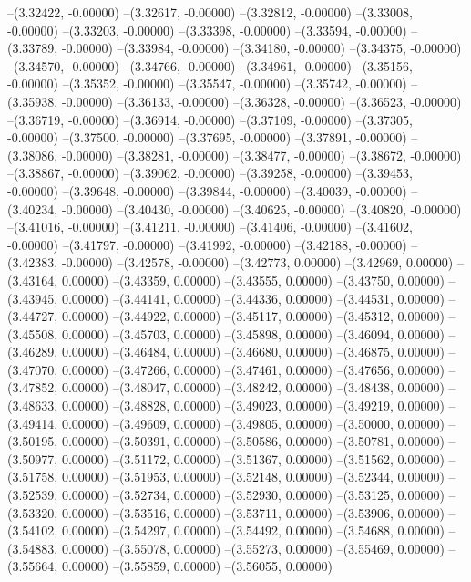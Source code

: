 --(3.32422, -0.00000)
--(3.32617, -0.00000)
--(3.32812, -0.00000)
--(3.33008, -0.00000)
--(3.33203, -0.00000)
--(3.33398, -0.00000)
--(3.33594, -0.00000)
--(3.33789, -0.00000)
--(3.33984, -0.00000)
--(3.34180, -0.00000)
--(3.34375, -0.00000)
--(3.34570, -0.00000)
--(3.34766, -0.00000)
--(3.34961, -0.00000)
--(3.35156, -0.00000)
--(3.35352, -0.00000)
--(3.35547, -0.00000)
--(3.35742, -0.00000)
--(3.35938, -0.00000)
--(3.36133, -0.00000)
--(3.36328, -0.00000)
--(3.36523, -0.00000)
--(3.36719, -0.00000)
--(3.36914, -0.00000)
--(3.37109, -0.00000)
--(3.37305, -0.00000)
--(3.37500, -0.00000)
--(3.37695, -0.00000)
--(3.37891, -0.00000)
--(3.38086, -0.00000)
--(3.38281, -0.00000)
--(3.38477, -0.00000)
--(3.38672, -0.00000)
--(3.38867, -0.00000)
--(3.39062, -0.00000)
--(3.39258, -0.00000)
--(3.39453, -0.00000)
--(3.39648, -0.00000)
--(3.39844, -0.00000)
--(3.40039, -0.00000)
--(3.40234, -0.00000)
--(3.40430, -0.00000)
--(3.40625, -0.00000)
--(3.40820, -0.00000)
--(3.41016, -0.00000)
--(3.41211, -0.00000)
--(3.41406, -0.00000)
--(3.41602, -0.00000)
--(3.41797, -0.00000)
--(3.41992, -0.00000)
--(3.42188, -0.00000)
--(3.42383, -0.00000)
--(3.42578, -0.00000)
--(3.42773, 0.00000)
--(3.42969, 0.00000)
--(3.43164, 0.00000)
--(3.43359, 0.00000)
--(3.43555, 0.00000)
--(3.43750, 0.00000)
--(3.43945, 0.00000)
--(3.44141, 0.00000)
--(3.44336, 0.00000)
--(3.44531, 0.00000)
--(3.44727, 0.00000)
--(3.44922, 0.00000)
--(3.45117, 0.00000)
--(3.45312, 0.00000)
--(3.45508, 0.00000)
--(3.45703, 0.00000)
--(3.45898, 0.00000)
--(3.46094, 0.00000)
--(3.46289, 0.00000)
--(3.46484, 0.00000)
--(3.46680, 0.00000)
--(3.46875, 0.00000)
--(3.47070, 0.00000)
--(3.47266, 0.00000)
--(3.47461, 0.00000)
--(3.47656, 0.00000)
--(3.47852, 0.00000)
--(3.48047, 0.00000)
--(3.48242, 0.00000)
--(3.48438, 0.00000)
--(3.48633, 0.00000)
--(3.48828, 0.00000)
--(3.49023, 0.00000)
--(3.49219, 0.00000)
--(3.49414, 0.00000)
--(3.49609, 0.00000)
--(3.49805, 0.00000)
--(3.50000, 0.00000)
--(3.50195, 0.00000)
--(3.50391, 0.00000)
--(3.50586, 0.00000)
--(3.50781, 0.00000)
--(3.50977, 0.00000)
--(3.51172, 0.00000)
--(3.51367, 0.00000)
--(3.51562, 0.00000)
--(3.51758, 0.00000)
--(3.51953, 0.00000)
--(3.52148, 0.00000)
--(3.52344, 0.00000)
--(3.52539, 0.00000)
--(3.52734, 0.00000)
--(3.52930, 0.00000)
--(3.53125, 0.00000)
--(3.53320, 0.00000)
--(3.53516, 0.00000)
--(3.53711, 0.00000)
--(3.53906, 0.00000)
--(3.54102, 0.00000)
--(3.54297, 0.00000)
--(3.54492, 0.00000)
--(3.54688, 0.00000)
--(3.54883, 0.00000)
--(3.55078, 0.00000)
--(3.55273, 0.00000)
--(3.55469, 0.00000)
--(3.55664, 0.00000)
--(3.55859, 0.00000)
--(3.56055, 0.00000)
